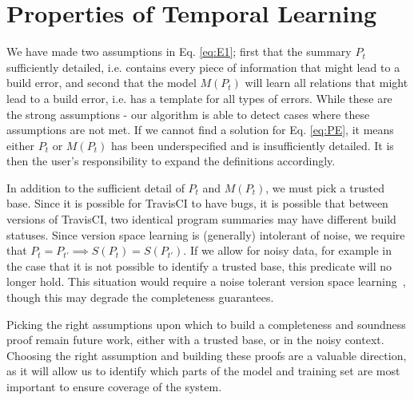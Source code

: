 \section{Properties of Temporal Learning}

We have made two assumptions in Eq. \ref{eq:E1}; first that the summary $P_t$ sufficiently detailed, i.e. contains every piece of information that might lead to a build error, and second that the model $M(P_t)$ will learn all relations that might lead to a build error, i.e. has a template for all types of errors.
While these are the strong assumptions - our algorithm is able to detect cases where these assumptions are not met.
If we cannot find a solution for Eq. \ref{eq:PE}, it means either $P_t$ or $M(P_t)$ has been underspecified and is insufficiently detailed.
It is then the user's responsibility to expand the definitions accordingly.

In addition to the sufficient detail of $P_t$ and $M(P_t)$, we must pick a trusted base.
Since it is possible for TravisCI to have bugs, it is possible that between versions of TravisCI, two identical program summaries may have different build statuses.
Since version space learning is (generally) intolerant of noise, we require that
$P_t = P_{t'} \implies S(P_t) = S(P_{t'})$.
If we allow for noisy data, for example in the case that it is not possible to identify a trusted base, this predicate will no longer hold.
This situation would require a noise tolerant version space learning~\cite{hong1997generalized}, though this may degrade the completeness guarantees.

Picking the right assumptions upon which to build a completeness and soundness proof remain future work, either with a trusted base, or in the noisy context.
Choosing the right assumption and building these proofs are a valuable direction, as it will allow us to identify which parts of the model and training set are most important to ensure coverage of the system.

